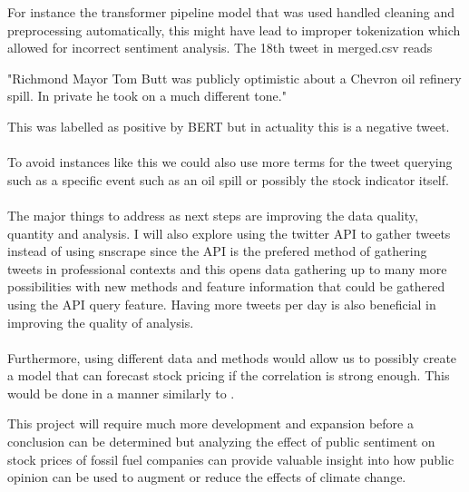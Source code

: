 \documentclass[12pt, letterpaper, titlepage]{article}
\begin{document}
	For instance the transformer pipeline model that was used handled cleaning and preprocessing automatically, this might have lead to improper tokenization which allowed for incorrect sentiment analysis. The 18th tweet in merged.csv reads 
	
	"Richmond Mayor Tom Butt was publicly optimistic about a Chevron oil refinery spill. In private he took on a much different tone." 
	
	This was labelled as positive by BERT but in actuality this is a negative tweet.
\paragraph{}
	To avoid instances like this we could also use more terms for the tweet querying such as a specific event such as an oil spill or possibly the stock indicator itself. 

\paragraph{}
The major things to address as next steps are improving the data quality, quantity and analysis. I will also explore using the twitter API to gather tweets instead of using snscrape since the API is the prefered method of gathering tweets in professional contexts and this opens data gathering up to many more possibilities with new methods and feature information that could be gathered using the API query feature.  Having more tweets per day is also beneficial in improving the quality of analysis. 

\paragraph{}
Furthermore, using different data and methods would allow us to possibly create a model that can forecast stock pricing if the correlation is strong enough. This would be done in a manner similarly to \citep{zhao2019forecasting}. 

This project will require much more development and expansion before a conclusion  can be determined but analyzing the effect of public sentiment on stock prices of fossil fuel companies can provide valuable insight into how public opinion can be used to augment or reduce the effects of climate change.
\bigskip
\bigskip
\bigskip
\bigskip
\bigskip
\bigskip
\bigskip
\bigskip
\bigskip
\bigskip
\bigskip
\bigskip
\bigskip
\bigskip
\bigskip
\bigskip
\bigskip
\bigskip
\bigskip
\bigskip
\bigskip
\bigskip
\bigskip
\bigskip


\end{document}
